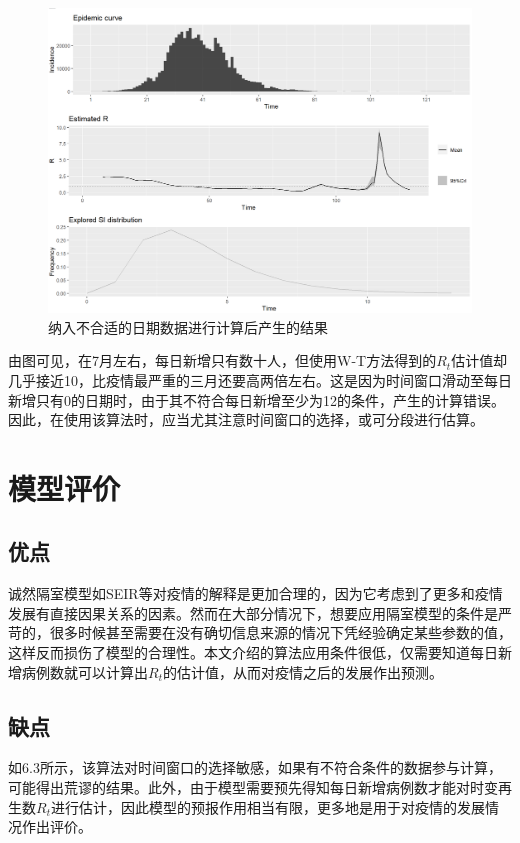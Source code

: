 \documentclass[a4paper,12pt,onecolumn,twoside]{article}
\begin{document}
\begin{figure}[H]
	\centering
	\includegraphics[width=\linewidth]{res/false.png}
	\caption{纳入不合适的日期数据进行计算后产生的结果}
\end{figure}
由图可见，在7月左右，每日新增只有数十人，但使用W-T方法得到的$R_{t}$估计值却几乎接近10，比疫情最严重的三月还要高两倍左右。这是因为时间窗口滑动至每日新增只有0的日期时，由于其不符合每日新增至少为12的条件，产生的计算错误。因此，在使用该算法时，应当尤其注意时间窗口的选择，或可分段进行估算。
\section{模型评价}
\subsection{优点~}诚然隔室模型如SEIR等对疫情的解释是更加合理的，因为它考虑到了更多和疫情发展有直接因果关系的因素。然而在大部分情况下，想要应用隔室模型的条件是严苛的，很多时候甚至需要在没有确切信息来源的情况下凭经验确定某些参数的值，这样反而损伤了模型的合理性。本文介绍的算法应用条件很低，仅需要知道每日新增病例数就可以计算出$R_{t}$的估计值，从而对疫情之后的发展作出预测。
\subsection{缺点~}如6.3所示，该算法对时间窗口的选择敏感，如果有不符合条件的数据参与计算，可能得出荒谬的结果。此外，由于模型需要预先得知每日新增病例数才能对时变再生数$R_{t}$进行估计，因此模型的预报作用相当有限，更多地是用于对疫情的发展情况作出评价。

	
	
\end{document}
